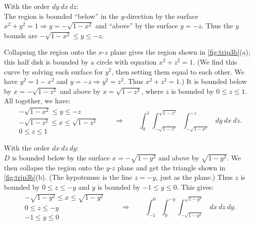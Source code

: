 \begin{example}
\noindent With the order $dy\ dx\ dz$:\\

The region is bounded ``below'' in the $y$-direction by the surface $x^2+y^2=1 \Rightarrow y=-\sqrt{1-x^2}$ and ``above'' by the surface $y=-z$. Thus the $y$ bounds are $-\sqrt{1-x^2}\leq y\leq -z$.


Collapsing the region onto the $x$-$z$ plane gives the region shown in \autoref{fig:trip3b}(a); this half disk is bounded by a circle with equation $x^2+z^2=1$. (We find this curve by solving each surface for $y^2$, then setting them equal to each other. We have $y^2=1-x^2$ and $y=-z\Rightarrow y^2=z^2$. Thus $x^2+z^2=1$.) It is bounded below by $x=-\sqrt{1-z^2}$ and above by $x=\sqrt{1-z^2}$, where $z$ is bounded by $0\leq z\leq 1$. All together, we have:
\[
 \begin{gathered}
  -\sqrt{1-x^2}\leq y\leq -z\\
  -\sqrt{1-z^2}\leq x\leq \sqrt{1-z^2}\\
  0\leq z\leq 1
 \end{gathered}
 \qquad\Rightarrow\qquad
 \int_{0}^1\int_{-\sqrt{1-z^2}}^{\sqrt{1-z^2}}\int_{-\sqrt{1-x^2}}^{-z}\ dy\ dx\ dz.
\]

\noindent With the order $dx\ dz\ dy$:\\

$D$ is bounded below by the surface $x=-\sqrt{1-y^2}$ and above by $\sqrt{1-y^2}$. We then collapse the region onto the $y$-$z$ plane and get the triangle shown in \autoref{fig:trip3b}(b). (The hypotenuse is the line $z=-y$, just as the plane.) Thus $z$ is bounded by $0\leq z\leq -y$ and $y$ is bounded by $-1\leq y\leq 0$. This gives:
\[
 \begin{gathered}
  -\sqrt{1-y^2}\leq x\leq \sqrt{1-y^2}\\
  0\leq z\leq -y\\
  -1\leq y\leq 0
 \end{gathered}
 \qquad\Rightarrow\qquad
 \int_{-1}^0\int_{0}^{-y}\int_{-\sqrt{1-y^2}}^{\sqrt{1-y^2}}\ dx\ dz\ dy.
\]
\end{example}

